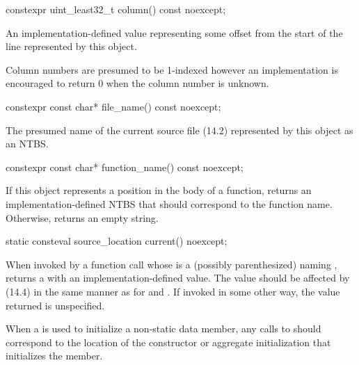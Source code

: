 \documentclass[a4paper,article]{article}
\begin{document}
\begin{itemdecl}
constexpr uint_least32_t column() const noexcept;
\end{itemdecl}
\begin{itemdescr}
\pnum
\returns
An implementation-defined value representing some offset from the start of the line represented by this object.

\note
Column numbers are presumed to be 1-indexed however an implementation is encouraged to return 0 when the column number is unknown.
\end{itemdescr}

\begin{itemdecl}
constexpr const char* file_name() const noexcept;
\end{itemdecl}
\begin{itemdescr}
\pnum
\returns
The presumed name of the current source file (14.2) represented by this object as an NTBS.
\end{itemdescr}

\begin{itemdecl}
constexpr const char* function_name() const noexcept;
\end{itemdecl}
\begin{itemdescr}
\pnum
\returns
If this object represents a position in the body of a function, returns an implementation-defined NTBS that should correspond to the function name.  Otherwise, returns an empty string.

\end{itemdescr}

\begin{itemdecl}
static consteval source_location current() noexcept;
\end{itemdecl}
\begin{itemdescr}
\pnum
\returns
When invoked by a function call whose  is a (possibly parenthesized)  naming , returns a  with an implementation-defined value. The value should be affected by  (14.4) in the same manner as for  and . If invoked in some other way, the value returned is unspecified.
\end{itemdescr}
\begin{itemdescr}
\pnum
\note
When a  is used to initialize a non-static data member, any calls to  should correspond to the location of the constructor or aggregate initialization that initializes the member.



\end{itemdescr}
\end{document}
